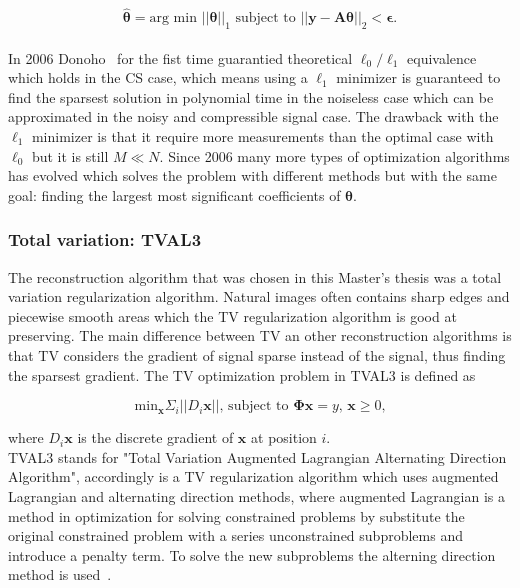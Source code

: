 \begin{equation}
    \mathbf{\hat{\theta}} = \text{arg min } ||\mathbf{\theta}||_1 \text{  subject to  } ||\mathbf{y - A\theta}||_2 < \mathbf{\epsilon} \text{.}
\end{equation}\\[0.1in]


In 2006 Donoho~\cite{article:CS_donoho1} for the fist time guarantied theoretical $\ell_0\text{/}\ell_1$ equivalence which holds in the CS case, which means using a $\ell_1$ minimizer is guaranteed to find the sparsest solution in polynomial time in the noiseless case which can be approximated in the noisy and compressible signal case. The drawback with the $\ell_1$ minimizer is that it require more measurements than the optimal case with $\ell_0$ but it is still $M \ll N$. Since 2006 many more types of optimization algorithms has evolved which solves the problem with different methods but with the same goal: finding the largest most significant coefficients of $\mathbf{\theta}$. \cite{article:CS_donoho1, article:single_pixel_im_cs, article:a_new_ci_arc}


\subsubsection{Total variation: TVAL3}
\label{sec:TV}
The reconstruction algorithm that was chosen in this Master's thesis was a total variation regularization algorithm. Natural images often contains sharp edges and piecewise smooth areas which the TV regularization algorithm is good at preserving. The main difference between TV an other reconstruction algorithms is that TV considers the gradient of signal sparse instead of the signal, thus finding the sparsest gradient. The TV optimization problem in TVAL3 is defined as  

\begin{equation}
\text{min}_\mathbf{x} \Sigma_i ||D_i \mathbf{x} || \text{, subject to } \mathbf{\Phi x} = 	y \text{, } \mathbf{x} \geq 0 \text{,} 
\end{equation}

where $D_i\mathbf{x}$ is the discrete gradient of $\mathbf{x}$ at position $i$.\\[0.1in]

TVAL3 stands for "Total Variation Augmented Lagrangian Alternating Direction Algorithm", accordingly is a TV regularization algorithm which uses augmented Lagrangian and alternating direction methods, where augmented Lagrangian is a method in optimization for solving constrained problems by substitute the original constrained problem with a series unconstrained subproblems and introduce a penalty term. To solve the new subproblems the alterning direction method is used~\cite{article:TVAL3}.\\[0.1in]

